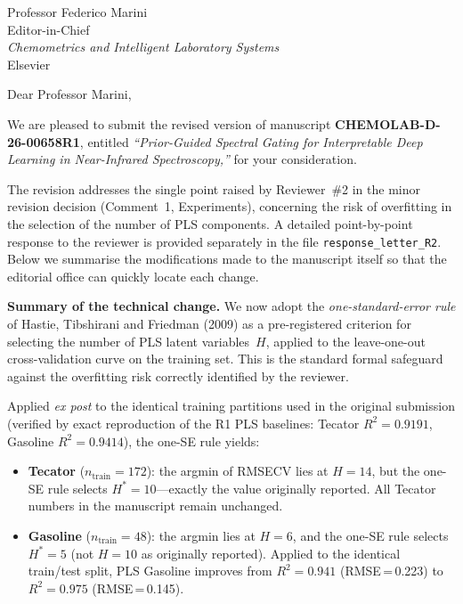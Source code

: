 \documentclass[11pt,a4paper]{letter}
\begin{document}
\begin{letter}{Professor Federico Marini \\
               Editor-in-Chief \\
               \textit{Chemometrics and Intelligent Laboratory Systems} \\
               Elsevier}

\opening{Dear Professor Marini,}

We are pleased to submit the revised version of manuscript
\textbf{CHEMOLAB-D-26-00658R1}, entitled
\textit{``Prior-Guided Spectral Gating for Interpretable Deep Learning in
Near-Infrared Spectroscopy,''} for your consideration.

The revision addresses the single point raised by Reviewer~\#2 in the minor
revision decision (Comment~1, Experiments), concerning the risk of
overfitting in the selection of the number of PLS components. A detailed
point-by-point response to the reviewer is provided separately in the file
\texttt{response\_letter\_R2}. Below we summarise the modifications made
to the manuscript itself so that the editorial office can quickly locate
each change.

\medskip
\textbf{Summary of the technical change.}
We now adopt the \emph{one-standard-error rule} of Hastie, Tibshirani and
Friedman (2009) as a pre-registered criterion for selecting the number of
PLS latent variables~$H$, applied to the leave-one-out cross-validation
curve on the training set. This is the standard formal safeguard against
the overfitting risk correctly identified by the reviewer.

Applied \emph{ex post} to the identical training partitions used in the
original submission (verified by exact reproduction of the R1 PLS
baselines: Tecator $R^2=0.9191$, Gasoline $R^2=0.9414$), the one-SE rule
yields:

\begin{itemize}
  \item \textbf{Tecator} ($n_{\text{train}}=172$): the argmin of RMSECV
        lies at $H=14$, but the one-SE rule selects $H^*=10$---exactly
        the value originally reported. All Tecator numbers in the
        manuscript remain unchanged.
  \item \textbf{Gasoline} ($n_{\text{train}}=48$): the argmin lies at
        $H=6$, and the one-SE rule selects $H^*=5$ (not $H=10$ as
        originally reported). Applied to the identical train/test split,
        PLS Gasoline improves from $R^2=0.941$ (RMSE\,=\,0.223) to
        $R^2=0.975$ (RMSE\,=\,0.145).
\end{itemize}


\end{letter}
\end{document}
